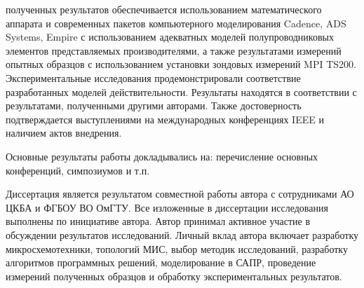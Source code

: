 {\reliability} полученных результатов обеспечивается использованием математического аппарата и современных пакетов компьютерного моделирования Cadence, ADS Systems, Empire с использованием адекватных моделей полупроводниковых элементов представляемых производителями, а также результатами измерений опытных образцов с использованием установки зондовых измерений MPI TS200. Экспериментальные исследования продемонстрировали соответствие разработанных моделей действительности. Результаты находятся в соответствии с результатами, полученными другими авторами. Также достоверность подтверждается выступлениями на международных конференциях IEEE и наличием актов внедрения.

{\probation}
Основные результаты работы докладывались на:
перечисление основных конференций, симпозиумов и т.\:п.

{\contribution} Диссертация является результатом совместной работы автора с сотрудниками АО ЦКБА и ФГБОУ ВО ОмГТУ. Все изложенные в диссертации исследования выполнены по инициативе автора. Автор принимал активное участие в обсуждении результатов исследований. Личный вклад автора включает разработку микросхемотехники, топологий МИС, выбор методик исследований, разработку алгоритмов программных решений, моделирование в САПР, проведение измерений полученных образцов и обработку экспериментальных результатов.


